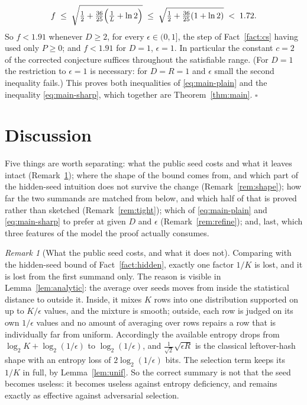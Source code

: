 \documentclass[11pt,a4paper]{article}
\theoremstyle{plain}
\theoremstyle{definition}
\theoremstyle{remark}
\newtheorem{remark}{Remark}
\begin{document}
\[
  f \;\le\; \sqrt{\tfrac12 + \tfrac{36}{25}\Bigl(\tfrac1L + \ln 2\Bigr)}
    \;\le\; \sqrt{\tfrac12 + \tfrac{36}{25}(1+\ln 2)} \;<\; 1.72 .
\]
So $f < 1.91$ whenever $D \ge 2$, for every $\epsilon \in (0,1]$, the step of Fact~\ref{fact:cs}
having used only $P \ge 0$; and $f < 1.91$ for $D = 1$, $\epsilon = 1$. In particular the constant
$c = 2$ of the corrected conjecture suffices throughout the satisfiable range. (For $D = 1$ the
restriction to $\epsilon = 1$ is necessary: for $D = R = 1$ and $\epsilon$ small the second
inequality fails.) This proves both inequalities of \eqref{eq:main-plain} and the inequality
\eqref{eq:main-sharp}, which together are Theorem~\ref{thm:main}.
\hfill$\square$

\section{Discussion}\label{sec:disc}

Five things are worth separating: what the public seed costs and what it leaves intact
(Remark~\ref{rem:cost}); where the shape of the bound comes from, and which part of the hidden-seed
intuition does not survive the change (Remark~\ref{rem:shape}); how far the two summands are
matched from below, and which half of that is proved rather than sketched
(Remark~\ref{rem:tight}); which of \eqref{eq:main-plain} and \eqref{eq:main-sharp} to prefer at
given $D$ and $\epsilon$ (Remark~\ref{rem:refine}); and, last, which three features of the model
the proof actually consumes.

\begin{remark}[What the public seed costs, and what it does not]\label{rem:cost}
Comparing with the hidden-seed bound of Fact~\ref{fact:hidden}, exactly one factor $1/K$ is lost, and it is lost from the first summand only. The reason is
visible in Lemma~\ref{lem:analytic}: the average over seeds moves from inside the statistical
distance to outside it. Inside, it mixes $K$ rows into one distribution supported on up to $K/\epsilon$
values, and the mixture is smooth; outside, each row is judged on its own $1/\epsilon$ values and
no amount of averaging over rows repairs a row that is individually far from uniform. Accordingly
the available entropy drops from $\log_2 K + \log_2(1/\epsilon)$ to $\log_2(1/\epsilon)$, and
$\tfrac{1}{\sqrt2}\sqrt{\epsilon R}$ is the classical leftover-hash shape with an entropy loss of
$2\log_2(1/\epsilon)$ bits. The selection term keeps its $1/K$ in full, by
Lemma~\ref{lem:unif}. So the correct summary is not that the seed becomes useless: it becomes
useless against entropy deficiency, and remains exactly as effective against adversarial selection.
\end{remark}
\end{document}
